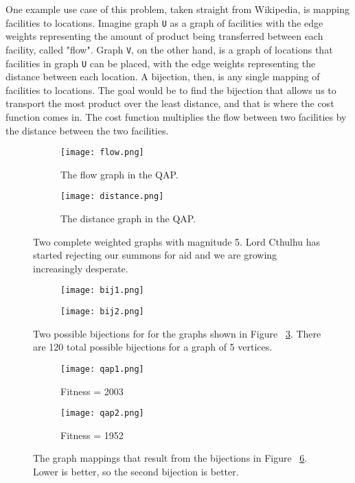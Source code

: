 \documentclass[sigconf]{acmart}
\begin{document}
One example use case of this problem, taken straight from Wikipedia, is mapping facilities to locations. Imagine graph \verb|U| as a graph of facilities with the edge weights representing the amount of product being transferred between each facility, called "flow". Graph \verb|V|, on the other hand, is a graph of locations that facilities in graph \verb|U| can be placed, with the edge weights representing the distance between each location. A bijection, then, is any single mapping of facilities to locations. The goal would be to find the bijection that allows us to transport the most product over the least distance, and that is where the cost function comes in. The cost function multiplies the flow between two facilities by the distance between the two facilities.

\begin {figure}
\centering
\begin{subfigure}{.5\columnwidth}
	\centering
	\texttt{[image: flow.png]}
	\caption{The flow graph in the QAP.}
	\label{fig:sub1}
\end{subfigure}%
\begin{subfigure}{.5\columnwidth}
	\centering
	\texttt{[image: distance.png]}
	\caption{The distance graph in the QAP.}
	\label{fig:sub2}
\end{subfigure}
\caption {Two complete weighted graphs with magnitude 5. Lord Cthulhu has started rejecting our summons for aid and we are growing increasingly desperate.}
\label{fig:k5}
\end {figure}

\begin {figure}
\centering
\begin{subfigure}{.5\columnwidth}
	\centering
	\texttt{[image: bij1.png]}
	\caption{}
	\label{fig:sub1}
\end{subfigure}%
\begin{subfigure}{.5\columnwidth}
	\centering
	\texttt{[image: bij2.png]}
	\caption{}
	\label{fig:sub2}
\end{subfigure}
\caption {Two possible bijections for for the graphs shown in Figure ~\ref{fig:k5}. There are 120 total possible bijections for a graph of 5 vertices.}
\label{fig:bij}
\end {figure}

\begin {figure}
\centering
\begin{subfigure}{.5\columnwidth}
	\centering
	\texttt{[image: qap1.png]}
	\caption{Fitness = 2003}
	\label{fig:sub1}
\end{subfigure}%
\begin{subfigure}{.5\columnwidth}
	\centering
	\texttt{[image: qap2.png]}
	\caption{Fitness = 1952}
	\label{fig:sub2}
\end{subfigure}
\caption {The graph mappings that result from the bijections in Figure ~\ref{fig:bij}. Lower is better, so the second bijection is better.}
\label{fig:qap}
\end {figure}
\end{document}
